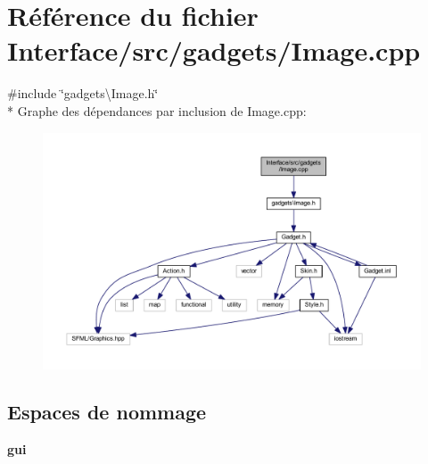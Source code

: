 \section{Référence du fichier Interface/src/gadgets/\+Image.cpp}
\label{_image_8cpp}
{\ttfamily \#include \char`\"{}gadgets\textbackslash{}\+Image.\+h\char`\"{}}\\*
Graphe des dépendances par inclusion de Image.\+cpp\+:\nopagebreak
\begin{figure}[H]
\begin{center}
\leavevmode
\includegraphics[width=350pt]{_image_8cpp__incl}
\end{center}
\end{figure}
\subsection*{Espaces de nommage}
\begin{DoxyCompactItemize}
\item 
 {\bf gui}
\end{DoxyCompactItemize}
